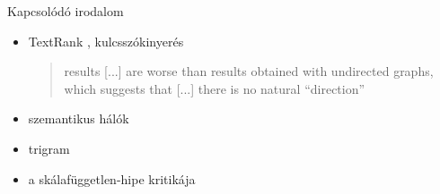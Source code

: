 \documentclass{beamer}
\newlength{\sepwid}
\newlength{\onecolwid}
\newlength{\twocolwid}
\begin{document}
\begin{frame}[t]
\begin{columns}[t]
\begin{column}{\twocolwid}
\begin{columns}
    \begin{column}{\sepwid} \end{column}   %

          \begin{column}{\onecolwid}
            \begin{block}{Kapcsolódó irodalom}
              \begin{itemize}
                \item TextRank \citep{mihalcea2004textrank}, kulcsszókinyerés
                  \begin{quote}
                    results [...] are worse than results obtained with undirected
                          graphs, which suggests that [...] there is no natural “direction”
                  \end{quote}
                \item szemantikus hálók \citep{steyvers2005large}
                \item trigram \citep{cancho2001thesmall}
                \item a skálafüggetlen-hipe kritikája
                  \citep{willinger2009mathematics}
              \end{itemize}
            \end{block}
          \end{column}
        \end{columns}



                \bigskip


\end{column}
\end{columns}
\end{frame}
\end{document}
